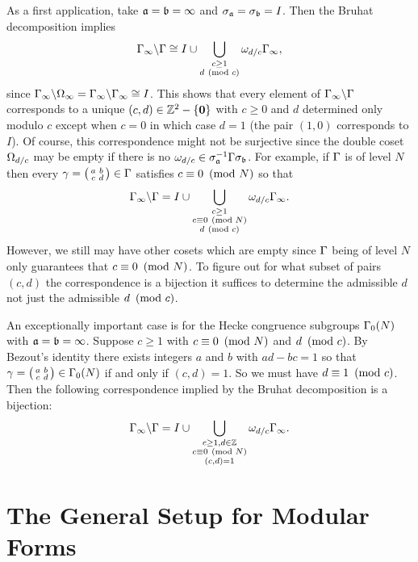       As a first application, take $\mathfrak{a} = \mathfrak{b} = \infty$ and $\sigma_{\mathfrak{a}} = \sigma_{\mathfrak{b}} = I$. Then the Bruhat decomposition implies
      \[
        \Gamma_{\infty}\backslash\Gamma \cong I\cup\bigcup_{\substack{c \ge 1 \\ d \ \left(\text{mod }c\right)}}\omega_{d/c}\Gamma_{\infty},
      \]
      since $\Gamma_{\infty}\backslash\Omega_{\infty} = \Gamma_{\infty}\backslash\Gamma_{\infty} \cong I$. This shows that every element of $\Gamma_{\infty}\backslash\Gamma$ corresponds to a unique $(c,d) \in \mathbb{Z}^{2}-\{\mathbf{0}\}$ with $c \ge 0$ and $d$ determined only modulo $c$ except when $c = 0$ in which case $d = 1$ (the pair $(1,0)$ corresponds to $I$). Of course, this correspondence might not be surjective since the double coset $\Omega_{d/c}$ may be empty if there is no $\omega_{d/c} \in \sigma_{\mathfrak{a}}^{-1}\Gamma\sigma_{\mathfrak{b}}$. For example, if $\Gamma$ is of level $N$ then every $\gamma = \begin{psmallmatrix} a & b \\ c & d \end{psmallmatrix} \in \Gamma$ satisfies $c \equiv 0 \ \left(\text{mod }N\right)$ so that
      \[
        \Gamma_{\infty}\backslash\Gamma = I\cup\bigcup_{\substack{c \ge 1 \\ c \equiv 0 \ \left(\text{mod }N\right) \\ d \ \left(\text{mod }c\right)}}\omega_{d/c}\Gamma_{\infty}.
      \]
      However, we still may have other cosets which are empty since $\Gamma$ being of level $N$ only guarantees that $c \equiv 0 \ \left(\text{mod }N\right)$. To figure out for what subset of pairs $(c,d)$ the correspondence is a bijection it suffices to determine the admissible $d$ not just the admissible $d \ \left(\text{mod }c\right)$. 
      
      \begin{remark}\label{rem:Bruhat_bijection}
        An exceptionally important case is for the Hecke congruence subgroups $\Gamma_{0}(N)$ with $\mathfrak{a} = \mathfrak{b} = \infty$. Suppose $c \ge 1$ with $c \equiv 0 \ \left(\text{mod }N\right)$ and $d \ \left(\text{mod }c\right)$. By Bezout's identity there exists integers $a$ and $b$ with $ad-bc = 1$ so that $\gamma = \begin{psmallmatrix} a & b \\ c & d \end{psmallmatrix} \in \Gamma_{0}(N)$ if and only if $(c,d) = 1$. So we must have $d \equiv 1 \ \left(\text{mod }c\right)$. Then the following correspondence implied by the Bruhat decomposition is a bijection:
        \[
          \Gamma_{\infty}\backslash\Gamma = I\cup\bigcup_{\substack{c \ge 1, d \in \mathbb{Z} \\ c \equiv 0 \ \left(\text{mod }N\right) \\ (c,d) = 1}}\omega_{d/c}\Gamma_{\infty}.
        \]
      \end{remark}
  \section{The General Setup for Modular Forms}\label{sec:The_General_Setup_for_Modular_Forms}
